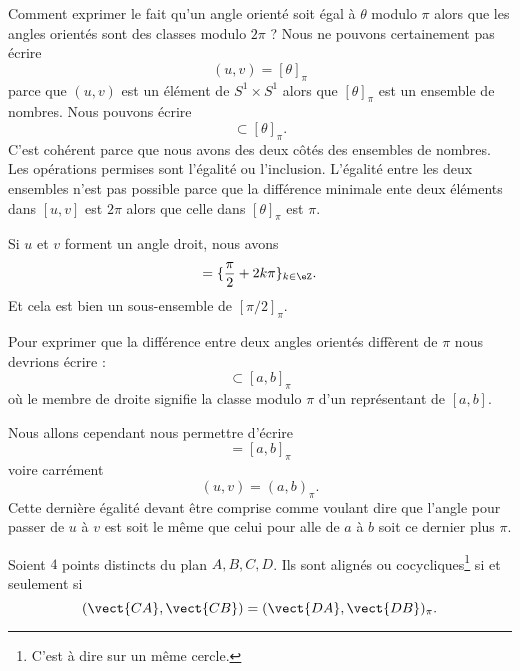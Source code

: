 \begin{normaltext}
    Comment exprimer le fait qu'un angle orienté soit égal à \( \theta\) modulo \( \pi\) alors que les angles orientés sont des classes modulo \( 2\pi\) ? Nous ne pouvons certainement pas écrire
    \begin{equation}
        (u,v)=[\theta]_{\pi}
    \end{equation}
    parce que \( (u,v)\) est un élément de \( S^1\times S^1\) alors que \( [\theta]_{\pi}\) est un ensemble de nombres. Nous pouvons écrire
    \begin{equation}
        [u,v]\subset [\theta]_{\pi}.
    \end{equation}
    C'est cohérent parce que nous avons des deux côtés des ensembles de nombres. Les opérations permises sont l'égalité ou l'inclusion. L'égalité entre les deux ensembles n'est pas possible parce que la différence minimale ente deux éléments dans \( [u,v]\) est \( 2\pi\) alors que celle dans \( [\theta]_{\pi}\) est \( \pi\).

    Si \( u\) et \( v\) forment un angle droit, nous avons
    \begin{equation}
        [u,v]=\{ \frac{ \pi }{2}+2k\pi \}_{k\in \eZ}.
    \end{equation}
    Et cela est bien un sous-ensemble de \( [\pi/2]_{\pi}\).

    Pour exprimer que la différence entre deux angles orientés diffèrent de \( \pi\) nous devrions écrire :
    \begin{equation}
        [u,v]\subset[a,b]_{\pi}
    \end{equation}
    où le membre de droite signifie la classe modulo \( \pi\) d'un représentant de \( [a,b]\). 

    Nous allons cependant nous permettre d'écrire
    \begin{equation}
        [u,v]=[a,b]_{\pi}
    \end{equation}
    voire carrément
    \begin{equation}
        (u,v)=(a,b)_{\pi}.
    \end{equation}
    Cette dernière égalité devant être comprise comme voulant dire que l'angle pour passer de \( u\) à \( v\) est soit le même que celui pour alle de \( a\) à \( b\) soit ce dernier plus \( \pi\).
\end{normaltext}

\begin{theorem}      \label{THOooUDUGooTJKDpO}
    Soient \( 4\) points distincts du plan \( A,B,C,D\). Ils sont alignés ou cocycliques\footnote{C'est à dire sur un même cercle.} si et seulement si
    \begin{equation}
        (\vect{ CA },\vect{ CB })=(\vect{ DA },\vect{ DB })_{\pi}.
    \end{equation}
\end{theorem}

